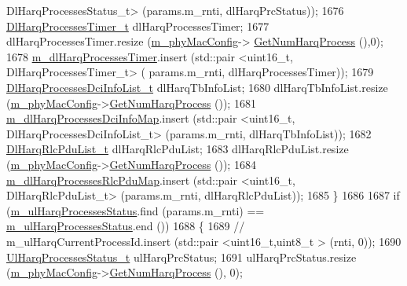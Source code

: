 \begin{DoxyCode}
       DlHarqProcessesStatus\_t> (params.m\_rnti, dlHarqPrcStatus));
1676         \hyperlink{classns3_1_1MmWaveFlexTtiMaxRateMacScheduler_a8666ecbc7c57fc48e6b80498262dfee7}{DlHarqProcessesTimer\_t} dlHarqProcessesTimer;
1677         dlHarqProcessesTimer.resize (\hyperlink{classns3_1_1MmWaveMacScheduler_a24d7af4971d2e500fe543cefbafa2fd9}{m\_phyMacConfig}->
      \hyperlink{classns3_1_1MmWavePhyMacCommon_a40773d84172ebeb5aff125f56ebcc5ac}{GetNumHarqProcess} (),0);
1678         \hyperlink{classns3_1_1MmWaveFlexTtiMaxRateMacScheduler_a8e10f292f6acda7b901589a74252dc95}{m\_dlHarqProcessesTimer}.insert (std::pair <uint16\_t, DlHarqProcessesTimer\_t> (
      params.m\_rnti, dlHarqProcessesTimer));
1679         \hyperlink{classns3_1_1MmWaveFlexTtiMaxRateMacScheduler_a677cdc9a2f5c2bb82d941530fff1362e}{DlHarqProcessesDciInfoList\_t} dlHarqTbInfoList;
1680         dlHarqTbInfoList.resize (\hyperlink{classns3_1_1MmWaveMacScheduler_a24d7af4971d2e500fe543cefbafa2fd9}{m\_phyMacConfig}->\hyperlink{classns3_1_1MmWavePhyMacCommon_a40773d84172ebeb5aff125f56ebcc5ac}{GetNumHarqProcess} ());
1681         \hyperlink{classns3_1_1MmWaveFlexTtiMaxRateMacScheduler_a1595e5398c1750599918db31324a3d68}{m\_dlHarqProcessesDciInfoMap}.insert (std::pair <uint16\_t,
       DlHarqProcessesDciInfoList\_t> (params.m\_rnti, dlHarqTbInfoList));
1682         \hyperlink{classns3_1_1MmWaveFlexTtiMaxRateMacScheduler_a78f8972d64d788105f80e53e209fccba}{DlHarqRlcPduList\_t} dlHarqRlcPduList;
1683         dlHarqRlcPduList.resize (\hyperlink{classns3_1_1MmWaveMacScheduler_a24d7af4971d2e500fe543cefbafa2fd9}{m\_phyMacConfig}->\hyperlink{classns3_1_1MmWavePhyMacCommon_a40773d84172ebeb5aff125f56ebcc5ac}{GetNumHarqProcess} ());
1684         \hyperlink{classns3_1_1MmWaveFlexTtiMaxRateMacScheduler_a5eeb7aeecc26d9849aadd3da24e00f68}{m\_dlHarqProcessesRlcPduMap}.insert (std::pair <uint16\_t,
       DlHarqRlcPduList\_t> (params.m\_rnti, dlHarqRlcPduList));
1685   \}
1686 
1687   \textcolor{keywordflow}{if} (\hyperlink{classns3_1_1MmWaveFlexTtiMaxRateMacScheduler_a4c1a909f08f91a4c845df5310c35f9ff}{m\_ulHarqProcessesStatus}.find (params.m\_rnti) == 
      \hyperlink{classns3_1_1MmWaveFlexTtiMaxRateMacScheduler_a4c1a909f08f91a4c845df5310c35f9ff}{m\_ulHarqProcessesStatus}.end ())
1688   \{
1689         \textcolor{comment}{//                              m\_ulHarqCurrentProcessId.insert (std::pair <uint16\_t,uint8\_t >
       (rnti, 0));}
1690         \hyperlink{classns3_1_1MmWaveFlexTtiMaxRateMacScheduler_a372b94d5ee1b47bb9005acc067ee9459}{UlHarqProcessesStatus\_t} ulHarqPrcStatus;
1691         ulHarqPrcStatus.resize (\hyperlink{classns3_1_1MmWaveMacScheduler_a24d7af4971d2e500fe543cefbafa2fd9}{m\_phyMacConfig}->\hyperlink{classns3_1_1MmWavePhyMacCommon_a40773d84172ebeb5aff125f56ebcc5ac}{GetNumHarqProcess} (), 0);

\end{DoxyCode}
